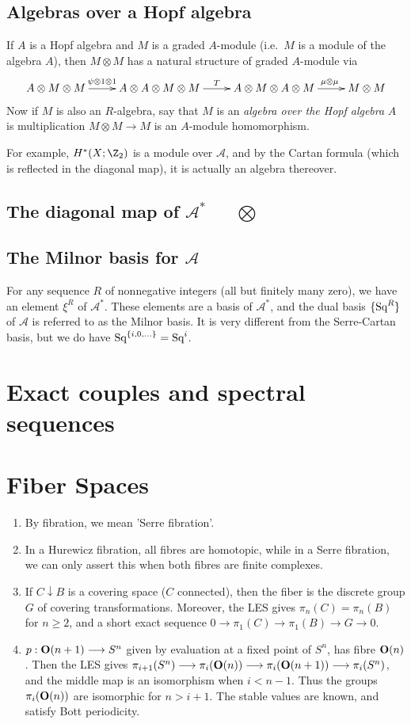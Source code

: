 \documentclass[11pt]{article}
\newcommand{\Squ}{\textup{Sq}}
\theoremstyle{plain}
\theoremstyle{definition}
\renewcommand{\to}{\longrightarrow}
\newcommand{\Steen}{\mathscr{A}}
\newcommand{\Orth}{\textup{\textbf{O}}}
\newcommand{\squishlist}{
  \setlength{\itemsep}{1pt}
  \setlength{\parskip}{0pt}
  \setlength{\parsep}{0pt}
}
\begin{document}
\subsection{Algebras over a Hopf algebra}
If $A$ is a Hopf algebra and $M$ is a graded $A$-module (i.e.\ $M$ is a module of the algebra $A$), then $M\otimes M$ has a natural structure of graded $A$-module via
\[\xymatrix{
A\otimes M\otimes M\ar[r]^{\psi\otimes1\otimes1\ \ \ }&A\otimes A\otimes M\otimes M\ar[r]^T&A\otimes M\otimes A\otimes M\ar[r]^{\qquad\mu\otimes \mu\ }&M\otimes M
}\]
Now if $M$ is also an $R$-algebra, say that $M$ is an \emph{algebra over the Hopf algebra} $A$ is multiplication $M\otimes M\to M$ is an $A$-module homomorphism.

For example, $H^*(X;\Z_2)$ is a module over $\Steen$, and by the Cartan formula (which is reflected in the diagonal map), it is actually an algebra thereover.
\subsection{The diagonal map of $\Steen^*$\ \ \ $\bigotimes$}
\subsection{The Milnor basis for $\Steen$}
For any sequence $R$ of nonnegative integers (all but finitely many zero), we have an element $\xi^R$ of $\Steen^*$. These elements are a basis of $\Steen^*$, and the dual basis $\{\Squ^R\}$ of $\Steen$ is referred to as the Milnor basis. It is very different from the Serre-Cartan basis, but we do have $\Squ^{\{i,0,\ldots\}}=\Squ^i$.

\section{Exact couples and spectral sequences}

\section{Fiber Spaces}
\begin{enumerate}
\squishlist
\item By fibration, we mean 'Serre fibration'.
\item In a Hurewicz fibration, all fibres are homotopic, while in a Serre fibration, we can only assert this when both fibres are finite complexes.
\item If $C\downarrow B$ is a covering space ($C$ connected), then the fiber is the discrete group $G$ of covering transformations. Moreover, the LES gives $\pi_n(C)=\pi_n(B)$ for $n\geq2$, and a short exact sequence $0\to\pi_1(C)\to\pi_1(B)\to G\to0$.
\item $p:\Orth(n+1)\to S^n$ given by evaluation at a fixed point of $S^n$, has fibre $\Orth(n)$. Then the LES gives $\pi_{i+1}(S^n)\to\pi_i(\Orth(n))\to\pi_i(\Orth(n+1))\to\pi_i(S^n)$, and the middle map is an isomorphism when $i<n-1$. Thus the groups $\pi_i(\Orth(n))$ are isomorphic for $n>i+1$. The stable values are known, and satisfy Bott periodicity.
\end{enumerate}
\setcounter{subsection}{3}
\end{document}

